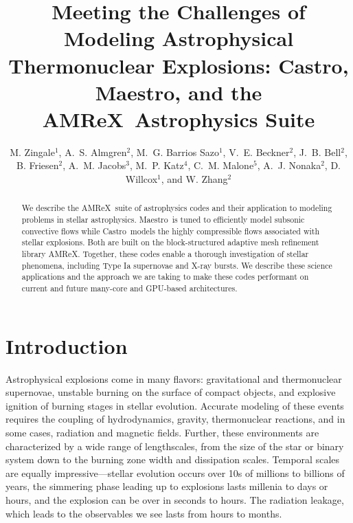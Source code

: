 \documentclass[letterpaper]{jpconf}
\newcommand{\maestro}{{\sffamily Maestro}}
\newcommand{\castro}{{\sffamily Castro}}
\newcommand{\amrex}{{\sffamily AMReX}}
\begin{document}
\title{Meeting the Challenges of Modeling Astrophysical Thermonuclear Explosions:
\castro, \maestro, and the \amrex\ Astrophysics Suite}

\author{M. Zingale$^1$,
        A.~S. Almgren$^2$,
        M.~G. Barrios Sazo$^1$,
        V.~E. Beckner$^2$,
        J.~B. Bell$^2$,
        B. Friesen$^2$,
        A.~M. Jacobs$^3$,
        M.~P. Katz$^4$,
        C.~M. Malone$^5$,
        A.~J. Nonaka$^2$,
        D. Willcox$^1$, and
        W. Zhang$^2$}

\address{$^1$Department of Physics and Astronomy, Stony Brook
  University, Stony Brook, NY 11794-3800 USA}

\address{$^2$Center for Computational Sciences and Engineering,
  Lawrence Berkeley National Lab, Berkeley, CA 94720 USA}

\address{$^3$Department of Physics and Astronomy, Michigan State
  University, East Lansing, Michigan 48824 USA}

\address{$^4$Nvidia Corporation}

\address{$^5$Los Alamos National Laboratory, Los Alamos, NM, 87545 USA}

\begin{abstract}
We describe the \amrex\ suite of astrophysics codes and their
application to modeling problems in stellar astrophysics.
\maestro\ is tuned to efficiently model subsonic convective flows
while \castro\ models the highly compressible flows associated with
stellar explosions.  Both are built on the block-structured adaptive
mesh refinement library \amrex.  Together, these codes enable a
thorough investigation of stellar phenomena, including Type Ia
supernovae and X-ray bursts.  We describe these science applications
and the approach we are taking to make these codes performant on
current and future many-core and GPU-based architectures.
\end{abstract}




\section{Introduction}

Astrophysical explosions come in many flavors: gravitational and
thermonuclear supernovae, unstable burning on the surface of compact
objects, and explosive ignition of burning stages in stellar
evolution.  Accurate modeling of these events requires the coupling of
hydrodynamics, gravity, thermonuclear reactions, and in some cases,
radiation and magnetic fields.  Further, these environments are
characterized by a wide range of lengthscales, from the size of the
star or binary system down to the burning zone width and dissipation
scales.  Temporal scales are equally impressive---stellar evolution
occurs over 10s of millions to billions of years, the simmering phase
leading up to explosions lasts millenia to days or hours, and the
explosion can be over in seconds to hours.  The radiation leakage,
which leads to the observables we see lasts from hours to months.
\end{document}
